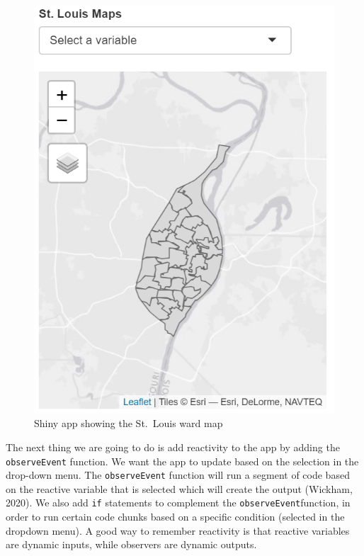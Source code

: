 \documentclass[
  krantz2]{krantz}
\begin{document}
\begin{figure}
\centering
\includegraphics{images/shiny_app2.png}
\caption{Shiny app showing the St.~Louis ward map}
\end{figure}

The next thing we are going to do is add reactivity to the app by adding the \texttt{observeEvent} function. We want the app to update based on the selection in the drop-down menu. The \texttt{observeEvent} function will run a segment of code based on the reactive variable that is selected which will create the output (Wickham, 2020). We also add \texttt{if} statements to complement the \texttt{observeEvent}function, in order to run certain code chunks based on a specific condition (selected in the dropdown menu). A good way to remember reactivity is that reactive variables are dynamic inputs, while observers are dynamic outputs.
\end{document}
